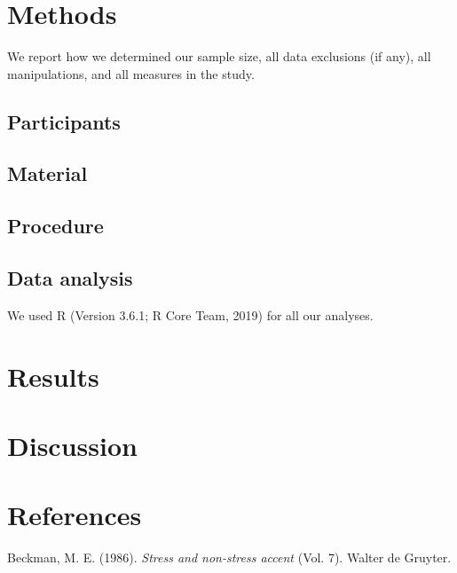 \documentclass[english,man]{apa6}
\begin{document}
\hypertarget{methods}{%
\section{Methods}\label{methods}}

We report how we determined our sample size, all data exclusions (if any), all manipulations, and all measures in the study.

\hypertarget{participants}{%
\subsection{Participants}\label{participants}}

\hypertarget{material}{%
\subsection{Material}\label{material}}

\hypertarget{procedure}{%
\subsection{Procedure}\label{procedure}}

\hypertarget{data-analysis}{%
\subsection{Data analysis}\label{data-analysis}}

We used R (Version 3.6.1; R Core Team, 2019) for all our analyses.

\hypertarget{results}{%
\section{Results}\label{results}}

\hypertarget{discussion}{%
\section{Discussion}\label{discussion}}

\newpage

\hypertarget{references}{%
\section{References}\label{references}}

\begingroup
\setlength{\parindent}{-0.5in}
\setlength{\leftskip}{0.5in}

\hypertarget{refs}{}
\leavevmode\hypertarget{ref-beckman1986stress}{}%
Beckman, M. E. (1986). \emph{Stress and non-stress accent} (Vol. 7). Walter de Gruyter.
\end{document}
